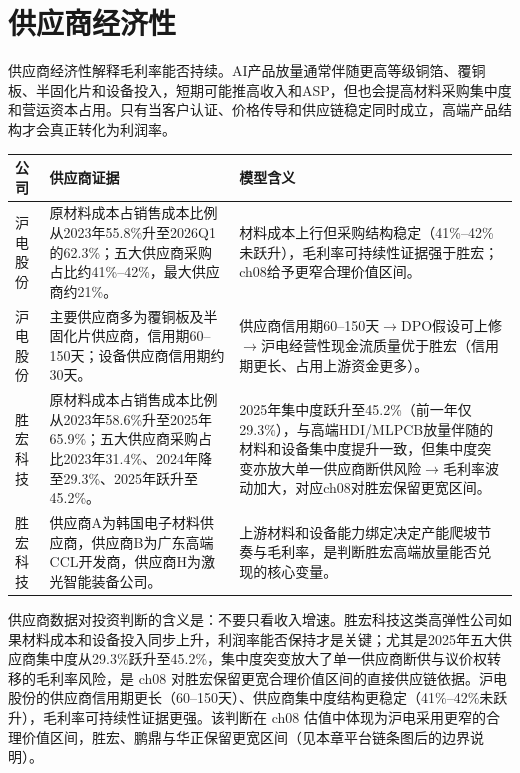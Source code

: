 \section{供应商经济性}

供应商经济性解释毛利率能否持续。AI产品放量通常伴随更高等级铜箔、覆铜板、半固化片和设备投入，短期可能推高收入和ASP，但也会提高材料采购集中度和营运资本占用。只有当客户认证、价格传导和供应链稳定同时成立，高端产品结构才会真正转化为利润率。

\begin{exhibitbox}[图表4-7：H股文件供应商集中度与材料成本占比]
\footnotesize
\begin{tabularx}{\textwidth}{L{1.8cm}X X}
\toprule
\textbf{公司} & \textbf{供应商证据} & \textbf{模型含义} \\
\midrule
沪电股份 & 原材料成本占销售成本比例从2023年55.8\%升至2026Q1的62.3\%；五大供应商采购占比约41\%--42\%，最大供应商约21\%。 & 材料成本上行但采购结构稳定（41\%--42\%未跃升），毛利率可持续性证据强于胜宏；ch08给予更窄合理价值区间。 \\
沪电股份 & 主要供应商多为覆铜板及半固化片供应商，信用期60--150天；设备供应商信用期约30天。 & 供应商信用期60--150天$\to$DPO假设可上修$\to$沪电经营性现金流质量优于胜宏（信用期更长、占用上游资金更多）。 \\
胜宏科技 & 原材料成本占销售成本比例从2023年58.6\%升至2025年65.9\%；五大供应商采购占比2023年31.4\%、2024年降至29.3\%、2025年跃升至45.2\%。 & 2025年集中度跃升至45.2\%（前一年仅29.3\%），与高端HDI/MLPCB放量伴随的材料和设备集中度提升一致，但集中度突变亦放大单一供应商断供风险$\to$毛利率波动加大，对应ch08对胜宏保留更宽区间。 \\
胜宏科技 & 供应商A为韩国电子材料供应商，供应商B为广东高端CCL开发商，供应商H为激光智能装备公司。 & 上游材料和设备能力绑定决定产能爬坡节奏与毛利率，是判断胜宏高端放量能否兑现的核心变量。 \\
\bottomrule
\end{tabularx}
\end{exhibitbox}

供应商数据对投资判断的含义是：不要只看收入增速。胜宏科技这类高弹性公司如果材料成本和设备投入同步上升，利润率能否保持才是关键；尤其是2025年五大供应商集中度从29.3\%跃升至45.2\%，集中度突变放大了单一供应商断供与议价权转移的毛利率风险，是 ch08 对胜宏保留更宽合理价值区间的直接供应链依据。沪电股份的供应商信用期更长（60--150天）、供应商集中度结构更稳定（41\%--42\%未跃升），毛利率可持续性证据更强。该判断在 ch08 估值中体现为沪电采用更窄的合理价值区间，胜宏、鹏鼎与华正保留更宽区间（见本章平台链条图后的边界说明）。
